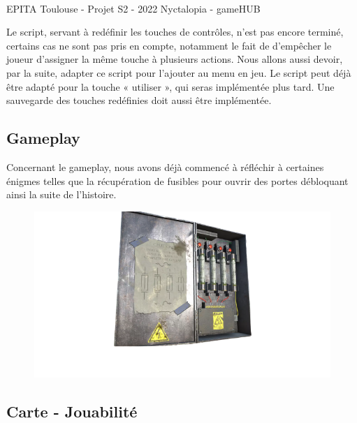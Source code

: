 \vfill
\noindent\makebox[\linewidth]{\rule{.8\paperwidth}{.6pt}}\\[0.2cm]
EPITA Toulouse - Projet S2 - 2022 \hfill Nyctalopia - gameHUB
\noindent\makebox[\linewidth]{\rule{.8\paperwidth}{.6pt}}

\newpage

Le script, servant à redéfinir les touches de contrôles, n’est pas encore terminé, certains cas ne sont pas pris en compte, notamment le fait de d’empêcher le joueur d’assigner la même touche à plusieurs actions. Nous allons aussi devoir, par la suite, adapter ce script pour l’ajouter au menu en jeu. Le script peut déjà être adapté pour la touche « utiliser », qui seras implémentée plus tard.
Une sauvegarde des touches redéfinies doit aussi être implémentée.

\subsection{Gameplay}

Concernant le gameplay, nous avons déjà commencé à réfléchir à certaines énigmes telles que la récupération de fusibles pour ouvrir des portes débloquant ainsi la suite de l’histoire.
\newline

\begin{figure}[H]
\centering
\begin{minipage}{.5\textwidth}
  \centering
  \centerline{\includegraphics[width=1.5\linewidth]{img/assets/fusibles.png}}
  \label{fig:fusebox}
\end{minipage}%
\end{figure}

\subsection{Carte - Jouabilité}

